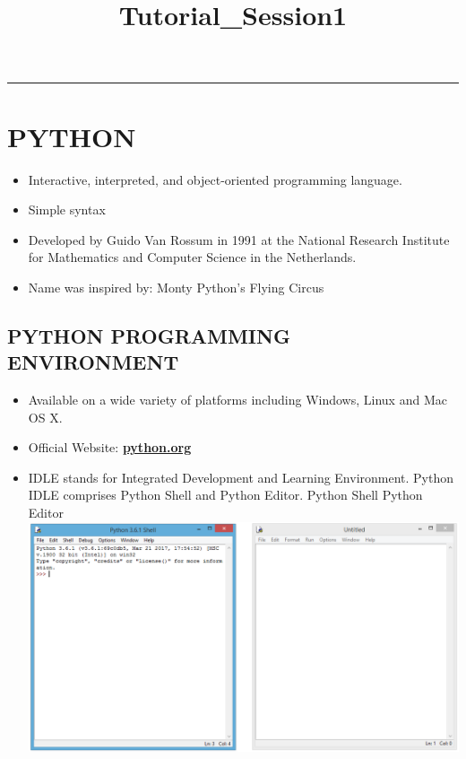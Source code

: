\documentclass[11pt]{article}
\title{Tutorial\_Session1}
\makeatletter
\def\maxwidth{\ifdim\Gin@nat@width>\linewidth\linewidth
    \else\Gin@nat@width\fi}
\let\Oldincludegraphics\includegraphics
\renewcommand{\includegraphics}[1]{\Oldincludegraphics[width=.8\maxwidth]{#1}}
\providecommand{\tightlist}{%
      \setlength{\itemsep}{0pt}\setlength{\parskip}{0pt}}
\makeatother
\begin{document}
    
    
    \maketitle
    
    

    
    \begin{center}\rule{0.5\linewidth}{\linethickness}\end{center}

\section{\texorpdfstring{ \textbf{PYTHON} }{ PYTHON }}\label{python}

\begin{itemize}
\tightlist
\item
  Interactive, interpreted, and object-oriented programming language.
\item
  Simple syntax
\item
  Developed by Guido Van Rossum in 1991 at the National Research
  Institute for Mathematics and Computer Science in the Netherlands.
\item
  Name was inspired by: Monty Python's Flying Circus
\end{itemize}

    \subsection{ PYTHON PROGRAMMING ENVIRONMENT
}\label{python-programming-environment}

\begin{itemize}
\tightlist
\item
  Available on a wide variety of platforms including Windows, Linux and
  Mac OS X.
\item
  Official Website: \textbf{\href{https://python.org}{python.org}}
\item
  IDLE stands for Integrated Development and Learning Environment.
  Python IDLE comprises Python Shell and Python Editor. Python Shell
  Python Editor\\
  \includegraphics{1.png}
\end{itemize}
\end{document}
